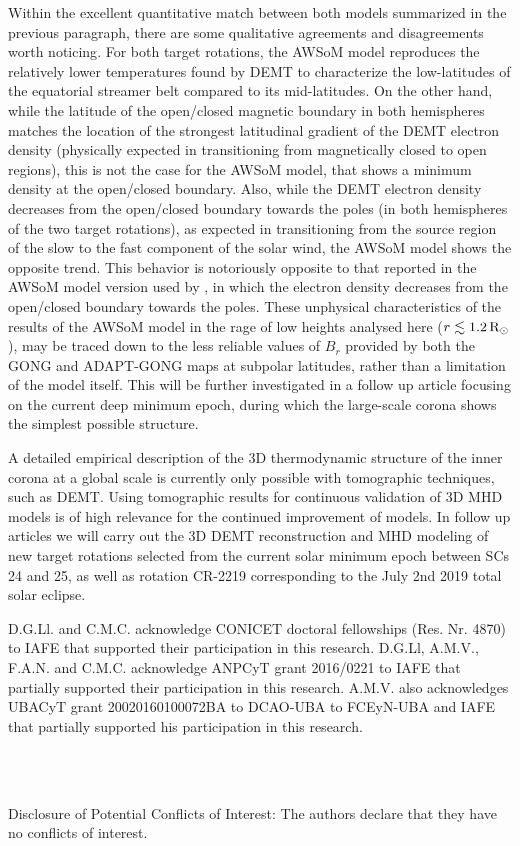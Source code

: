 \documentclass[namedreferences]{solarphysics}
\newcommand{\mrsun}{{\rm R_\odot}}
\begin{document}
\begin{article}
Within the {excellent quantitative match between both {models summarized} in the previous paragraph, there are some qualitative agreements and {disagreements worth noticing}. For both target rotations, the AWSoM model reproduces the relatively lower temperatures found by DEMT to characterize the low-latitudes of the equatorial streamer belt compared to its mid-latitudes. On the other hand, while the latitude of the open/closed magnetic boundary in both hemispheres matches the location of the strongest latitudinal gradient of the DEMT electron density {(physically expected in transitioning from magnetically closed to open regions)}, this is not the case for the AWSoM model, that shows a minimum density at the open/closed boundary. Also, while the DEMT electron density decreases from the open/closed boundary towards the poles (in both hemispheres of the two target rotations), {as expected in transitioning from the source region of the slow to the fast component of the solar wind}, the AWSoM model shows the opposite trend. This behavior is notoriously opposite to that reported in the AWSoM model version used by \citet{oran_2015}, in which the electron density decreases from the open/closed boundary towards the poles.} {These unphysical characteristics of the results of the AWSoM model in the rage of low heights analysed here ($r\lesssim 1.2\,\mrsun$), may be traced down to the less reliable values of $B_r$ provided by both the GONG and ADAPT-GONG maps at subpolar latitudes, rather than a limitation of the model itself. This will be further investigated in a follow up article focusing on the current deep minimum epoch, during which the large-scale corona shows the simplest possible structure.}

A detailed empirical description of the 3D thermodynamic structure of the inner corona at a global scale is currently only possible with tomographic techniques, such as DEMT. Using tomographic results for continuous validation of 3D MHD models is of high relevance for the continued improvement of models. In {follow up articles} we will {carry out the 3D DEMT reconstruction and MHD modeling of} new target rotations {selected from} the current solar minimum {epoch} between SCs 24 and 25, {as well as rotation CR-2219 corresponding to the July 2nd 2019 total solar eclipse.}

\begin{acks}
D.G.Ll. and C.M.C. {acknowledge} CONICET doctoral {fellowships} (Res. Nr. 4870) to IAFE that supported {their} participation in this research. {D.G.Ll, A.M.V., F.A.N. and C.M.C. acknowledge ANPCyT grant 2016/0221 to IAFE that partially supported their participation in this research. A.M.V. also acknowledges UBACyT grant 20020160100072BA to DCAO-UBA to FCEyN-UBA and IAFE that partially supported his participation in this research.}
\end{acks}
\\
\\
\begin{footnotesize}
 Disclosure of Potential Conflicts of Interest: The authors declare that they have no conflicts of interest.
\end{footnotesize}

  

\end{article} 
\end{document}
